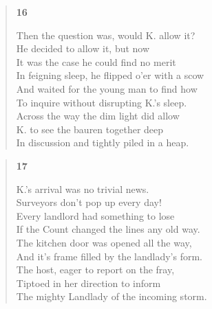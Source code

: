 \documentclass{article}
\begin{document}
\newpage
\begin{verse}
  \begin{center}
    \textbf{16} \\
  \end{center}
  Then the question was, would K. allow it? \\
  He decided to allow it, but now \\
  It was the case he could find no merit \\
  In feigning sleep, he flipped o'er with a scow \\
  And waited for the young man to find how \\
  To inquire without disrupting K.'s sleep. \\
  Across the way the dim light did allow \\
  K. to see the bauren together deep \\
  In discussion and tightly piled in a heap.
\end{verse}
\begin{verse}
  \begin{center}
    \textbf{17} \\
  \end{center}
  K.'s arrival was no trivial news. \\
  Surveyors don't pop up every day! \\
  Every landlord had something to lose \\
  If the Count changed the lines any old way. \\
  The kitchen door was opened all the way, \\
  And it's frame filled by the landlady's form. \\
  The host, eager to report on the fray, \\
  Tiptoed in her direction to inform \\
  The mighty Landlady of the incoming storm.
\end{verse}
\end{document}
